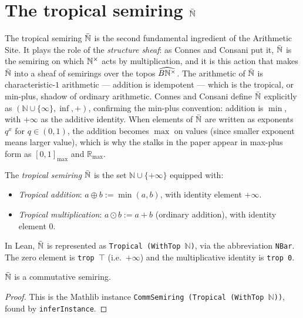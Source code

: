 \chapter{The tropical semiring \texorpdfstring{$\bar{\mathbb{N}}$}{Nbar}}

The tropical semiring $\bar{\mathbb{N}}$ is the second fundamental ingredient of
the Arithmetic Site.  It plays the role of the \emph{structure sheaf}:
as Connes and Consani put it, $\bar{\mathbb{N}}$ is the semiring on which $\mathbb{N}^{\times}$
acts by multiplication, and it is this action that makes $\bar{\mathbb{N}}$ into
a sheaf of semirings over the topos $\widehat{B\mathbb{N}^{\times}}$.  The arithmetic
of $\bar{\mathbb{N}}$ is characteristic-$1$ arithmetic --- addition is idempotent
--- which is the tropical, or min-plus, shadow of ordinary arithmetic.
Connes and Consani define $\bar{\mathbb{N}}$ explicitly as $(\mathbb{N} \cup \{\infty\},
\inf, +)$, confirming the min-plus convention: addition is $\min$, with
$+\infty$ as the additive identity.  When elements of $\bar{\mathbb{N}}$ are written
as exponents $q^x$ for $q \in (0,1)$, the addition becomes $\max$ on
values (since smaller exponent means larger value), which is why the
stalks in the paper appear in max-plus form as $[0,1]_{\max}$ and
$\mathbb{R}_{\max}$.

\begin{definition}[label=def:Nbar]
  \label{def:Nbar}\leanok
  The \emph{tropical semiring} $\bar{\mathbb{N}}$ is the set
  $\mathbb{N} \cup \{+\infty\}$ equipped with:
  \begin{itemize}
    \item \emph{Tropical addition}: $a \oplus b := \min(a, b)$, with
          identity element $+\infty$.
    \item \emph{Tropical multiplication}: $a \odot b := a + b$
          (ordinary addition), with identity element $0$.
  \end{itemize}
  In Lean, $\bar{\mathbb{N}}$ is represented as \texttt{Tropical (WithTop $\mathbb{N}$)},
  via the abbreviation \texttt{NBar}.
  The zero element is \texttt{trop $\top$} (i.e.\ $+\infty$) and the
  multiplicative identity is \texttt{trop 0}.
\end{definition}

\begin{lemma}[label=lem:Nbar_semiring, uses=def:Nbar]
  \label{lem:Nbar_semiring}\leanok
  $\bar{\mathbb{N}}$ is a commutative semiring.
\end{lemma}
\begin{proof}
  This is the Mathlib instance
  \texttt{CommSemiring (Tropical (WithTop $\mathbb{N}$))},
  found by \texttt{inferInstance}.
\end{proof}

